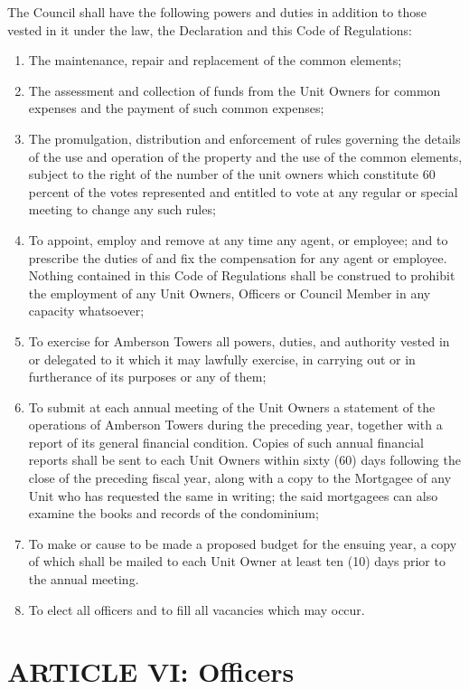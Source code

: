 \documentclass[
  14pt,
]{book}
\begin{document}
The Council shall have the following powers and duties in addition to those vested in it under the law, the Declaration and this Code of Regulations:

\begin{enumerate}
\def\labelenumi{(\alph{enumi})}
\item
  The maintenance, repair and replacement of the common elements;
\item
  The assessment and collection of funds from the Unit Owners for common expenses and the payment of such common expenses;
\item
  The promulgation, distribution and enforcement of rules governing the details of the use and operation of the property and the use of the common elements, subject to the right of the number of the unit owners which constitute 60 percent of the votes represented and entitled to vote at any regular or special meeting to change any such rules;
\item
  To appoint, employ and remove at any time any agent, or employee; and to prescribe the duties of and fix the compensation for any agent or employee. Nothing contained in this Code of Regulations shall be construed to prohibit the employment of any Unit Owners, Officers or Council Member in any capacity whatsoever;
\item
  To exercise for Amberson Towers all powers, duties, and authority vested in or delegated to it which it may lawfully exercise, in carrying out or in furtherance of its purposes or any of them;
\item
  To submit at each annual meeting of the Unit Owners a statement of the operations of Amberson Towers during the preceding year, together with a report of its general financial condition. Copies of such annual financial reports shall be sent to each Unit Owners within sixty (60) days following the close of the preceding fiscal year, along with a copy to the Mortgagee of any Unit who has requested the same in writing; the said mortgagees can also examine the books and records of the condominium;
\item
  To make or cause to be made a proposed budget for the ensuing year, a copy of which shall be mailed to each Unit Owner at least ten (10) days prior to the annual meeting.
\item
  To elect all officers and to fill all vacancies which may occur.
\end{enumerate}

\hypertarget{article-vi-officers}{%
\section*{ARTICLE VI: Officers}\label{article-vi-officers}}
\end{document}
